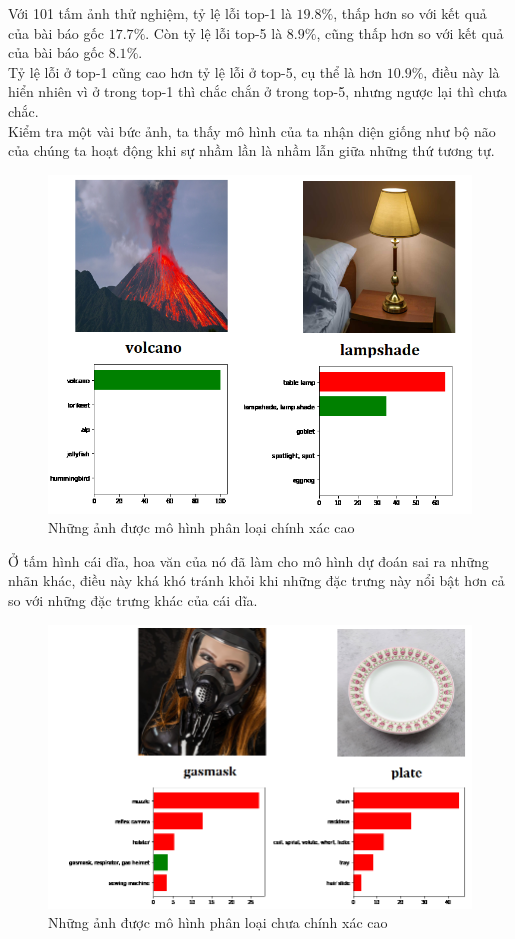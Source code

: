 \documentclass[a4paper]{article}
\begin{document}
\noindent
Với 101 tấm ảnh thử nghiệm, tỷ lệ lỗi top-1 là $19.8\%$, thấp hơn so với kết quả của bài báo gốc $17.7\%$. Còn tỷ lệ lỗi top-5 là $8.9\%$, cũng thấp hơn so với kết quả của bài báo gốc $8.1\%$.\\
Tỷ lệ lỗi ở top-1 cũng cao hơn tỷ lệ lỗi ở top-5, cụ thể là hơn $10.9\%$, điều này là hiển nhiên vì ở trong top-1 thì chắc chắn ở trong top-5, nhưng ngược lại thì chưa chắc.\\
Kiểm tra một vài bức ảnh, ta thấy mô hình của ta nhận diện giống như bộ não của chúng ta hoạt động khi sự nhầm lần là nhầm lẫn giữa những thứ tương tự.
\begin{figure}[h!]
\centering
\includegraphics[width=15cm]{images/res1.PNG}
\caption*{Những ảnh được mô hình phân loại chính xác cao}
\end{figure}

\noindent
Ở tấm hình cái dĩa, hoa văn của nó đã làm cho mô hình dự đoán sai ra những nhãn khác, điều này khá khó tránh khỏi khi những đặc trưng này nổi bật hơn cả so với những đặc trưng khác của cái dĩa.
\newpage

\begin{figure}[h!]
\centering
\includegraphics[width=15cm]{images/res2.PNG}
\caption*{Những ảnh được mô hình phân loại chưa chính xác cao}
\end{figure}
\end{document}
